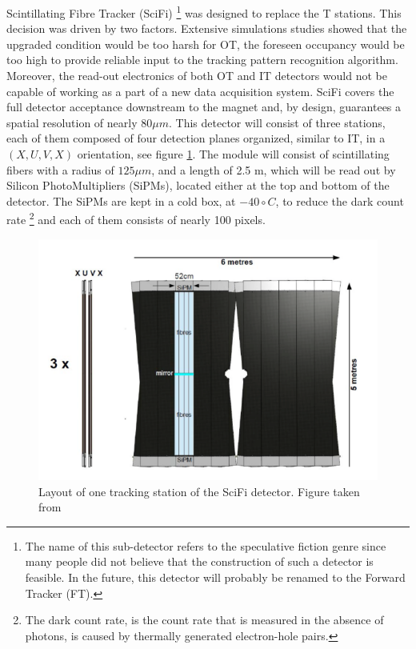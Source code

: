 Scintillating Fibre Tracker (SciFi) \cite{upgrade_tracker_tdr} \footnote{The name of this sub-detector refers to the speculative fiction genre since many people did not believe that the construction of such a detector is feasible. In the future, this detector will probably be renamed to the Forward Tracker (FT).} was designed to replace the T stations. This decision was driven by two factors. Extensive simulations studies showed that the upgraded condition would be too harsh for OT, the foreseen occupancy would be too high to provide reliable input to the tracking pattern recognition algorithm. Moreover, the read-out electronics of both OT and IT detectors would not be capable of working as a part of a new data acquisition system. SciFi covers the full detector acceptance downstream to the magnet and, by design, guarantees a spatial resolution of nearly $80 \mu m$. 
This detector will consist of three stations, each of them composed of four detection planes organized, similar to IT,  in a $(X, U, V, X)$ orientation, see figure \ref{fig:SciFI}.
 The module will consist of scintillating fibers with a radius of  $125 \mu m$, and a length of 2.5 m, which will be read out by Silicon PhotoMultipliers (SiPMs), located either at the top and bottom of the detector. The SiPMs are kept in a cold box, at $-40 \circ C$, to reduce the dark count rate \footnote{The dark count rate, is the count rate that is measured in the absence of photons, is caused by thermally generated electron-hole pairs.} and each of them consists of nearly 100 pixels.   


\begin{figure}[!h]
\centering
\includegraphics[scale=0.6]{figures/SciFi.PNG}
\caption{Layout of one tracking station of the SciFi detector. Figure taken from \cite{upgrade_tracker_tdr}
\label{fig:SciFI}}
\end{figure}

